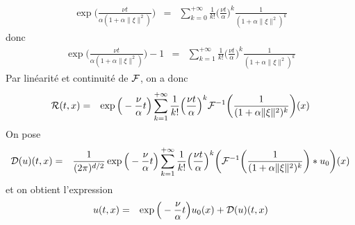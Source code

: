 \begin{eqnarray*}
    \exp\bigg(\frac{\nu t}{\alpha(1+\alpha \|\xi\|^2)}\bigg) &=& \sum_{k=0}^{+\infty} \frac{1}{k!}\Big(\frac{\nu t}{\alpha}\Big)^k\frac{1}{(1+\alpha\|\xi\|^2)^k}
\end{eqnarray*}
donc
\begin{eqnarray*}
    \exp\bigg(\frac{\nu t}{\alpha(1+\alpha \|\xi\|^2)}\bigg)-1 &=& \sum_{k=1}^{+\infty} \frac{1}{k!}\Big(\frac{\nu t}{\alpha}\Big)^k\frac{1}{(1+\alpha\|\xi\|^2)^k}
\end{eqnarray*}
Par linéarité et continuité de $\mathcal{F}$, on a donc
\begin{eqnarray*}
    \mathcal{R}(t,x) &=& \exp\Big(-\frac{\nu}{\alpha}t\Big)\sum_{k=1}^{+\infty} \frac{1}{k!}\Big(\frac{\nu t}{\alpha}\Big)^k\mathcal{F}^{-1}\bigg(\frac{1}{(1+\alpha\|\xi\|^2)^k}\bigg)(x)
\end{eqnarray*}
On pose 
\begin{eqnarray*}
    \mathcal{D}(u)(t,x) &=& \frac{1}{(2\pi)^{d/2}}\exp\Big(-\frac{\nu}{\alpha}t\Big)\sum_{k=1}^{+\infty} \frac{1}{k!}\Big(\frac{\nu t}{\alpha}\Big)^k\bigg(\mathcal{F}^{-1}\bigg(\frac{1}{(1+\alpha\|\xi\|^2)^k}\bigg)*u_0\bigg)(x)
\end{eqnarray*}
et on obtient l'expression
\begin{eqnarray*}
    u(t,x) &=& \exp\Big(-\frac{\nu}{\alpha}t\Big)u_0(x) + \mathcal{D}(u)(t,x)
\end{eqnarray*}